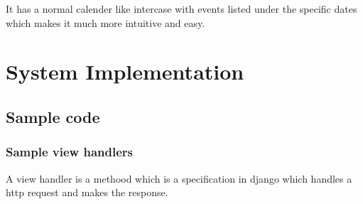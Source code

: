 \documentclass{article}
\begin{document}
It has a normal calender like intercase with events listed under the specific dates which makes it much more intuitive and easy.

\vspace{1em}


\newpage

\section{System Implementation}
\vspace{1em}

\subsection{Sample code}
\vspace{1em}


\subsubsection{Sample view handlers}
A view handler is a methood which is a specification in django which handles a http request and makes the response.
\vspace{1em}
\end{document}
